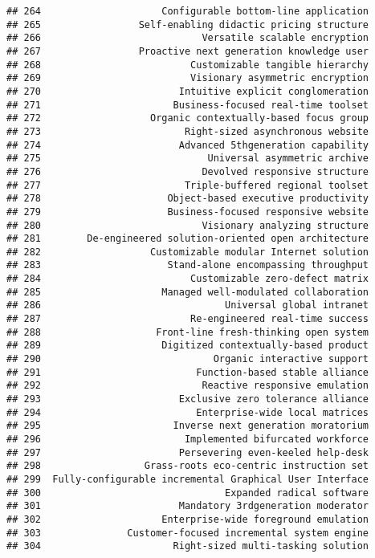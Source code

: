 \documentclass[
]{article}
\begin{document}
\begin{verbatim}
## 264                     Configurable bottom-line application
## 265                 Self-enabling didactic pricing structure
## 266                            Versatile scalable encryption
## 267                 Proactive next generation knowledge user
## 268                          Customizable tangible hierarchy
## 269                          Visionary asymmetric encryption
## 270                        Intuitive explicit conglomeration
## 271                       Business-focused real-time toolset
## 272                   Organic contextually-based focus group
## 273                         Right-sized asynchronous website
## 274                        Advanced 5thgeneration capability
## 275                             Universal asymmetric archive
## 276                            Devolved responsive structure
## 277                         Triple-buffered regional toolset
## 278                      Object-based executive productivity
## 279                      Business-focused responsive website
## 280                            Visionary analyzing structure
## 281        De-engineered solution-oriented open architecture
## 282                   Customizable modular Internet solution
## 283                      Stand-alone encompassing throughput
## 284                          Customizable zero-defect matrix
## 285                     Managed well-modulated collaboration
## 286                                Universal global intranet
## 287                          Re-engineered real-time success
## 288                    Front-line fresh-thinking open system
## 289                     Digitized contextually-based product
## 290                              Organic interactive support
## 291                           Function-based stable alliance
## 292                            Reactive responsive emulation
## 293                        Exclusive zero tolerance alliance
## 294                           Enterprise-wide local matrices
## 295                       Inverse next generation moratorium
## 296                         Implemented bifurcated workforce
## 297                        Persevering even-keeled help-desk
## 298                  Grass-roots eco-centric instruction set
## 299  Fully-configurable incremental Graphical User Interface
## 300                                Expanded radical software
## 301                        Mandatory 3rdgeneration moderator
## 302                     Enterprise-wide foreground emulation
## 303               Customer-focused incremental system engine
## 304                       Right-sized multi-tasking solution

\end{verbatim}
\end{document}
